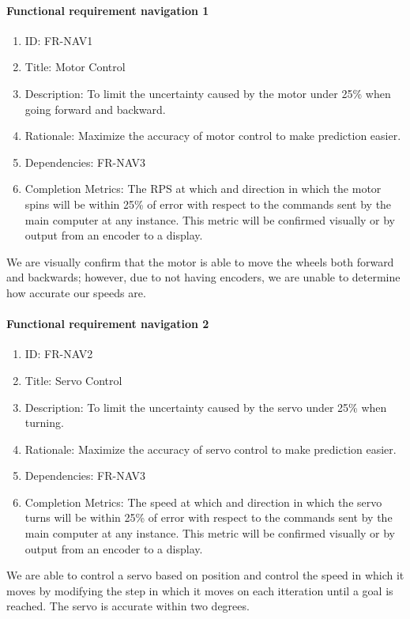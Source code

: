 \documentclass[compsoc,draftclsnofoot,onecolumn,10pt]{IEEEtran}
\begin{document}
	\paragraph{\textbf{Functional requirement navigation 1}}
		\begin{enumerate}
			\item ID: FR-NAV1
			\item Title: Motor Control
			\item Description: To limit the uncertainty caused by the motor under 25\% when going forward and backward.
			\item Rationale: Maximize the accuracy of motor control to make prediction easier.
			\item Dependencies: FR-NAV3
			\item Completion Metrics: The RPS at which and direction in which the motor spins will be within 25\% of error with respect to the commands sent by the main computer at any instance. 
			This metric will be confirmed visually or by output from an encoder to a display.
		\end{enumerate}
    We are visually confirm that the motor is able to move the wheels both forward and backwards; however, due to not having encoders, we are unable to determine how accurate our speeds are.
    
	\paragraph{\textbf{Functional requirement navigation 2}}
		\begin{enumerate}
			\item ID: FR-NAV2
			\item Title: Servo Control
			\item Description: To limit the uncertainty caused by the servo under 25\% when turning.
			\item Rationale: Maximize the accuracy of servo control to make prediction easier.
			\item Dependencies: FR-NAV3
			\item Completion Metrics: The speed at which and direction in which the servo turns will be within 25\% of error with respect to the commands sent by the main computer at any instance. 
			This metric will be confirmed visually or by output from an encoder to a display.
		\end{enumerate}
    We are able to control a servo based on position and control the speed in which it moves by modifying the step in which it moves on each itteration until a goal is reached. The servo is accurate within two degrees. 
        
\end{document}
